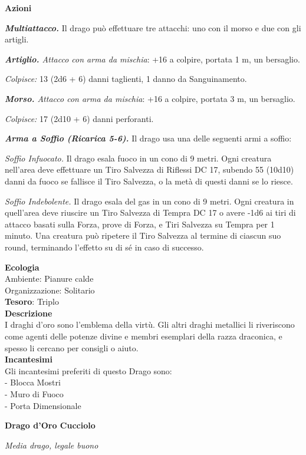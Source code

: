 \begin{multicols}{2}
\textbf{Azioni}

\textit{\textbf{Multiattacco.}} Il drago può effettuare tre attacchi: uno con il morso e due con gli artigli.

\textit{\textbf{Artiglio.} Attacco con arma da mischia}: +16 a colpire, portata 1 m, un bersaglio.

\textit{Colpisce:} 13 (2d6 + 6) danni taglienti, 1 danno da Sanguinamento.

\textit{\textbf{Morso.} Attacco con arma da mischia}: +16 a colpire, portata 3 m, un bersaglio.

\textit{Colpisce:} 17 (2d10 + 6) danni perforanti.

\textit{\textbf{Arma a Soffio (Ricarica 5-6).}} Il drago usa una delle seguenti armi a soffio:

\textit{Soffio Infuocato.} Il drago esala fuoco in un cono di 9 metri. Ogni creatura nell'area deve effettuare un Tiro Salvezza di Riflessi DC 17, subendo 55 (10d10) danni da fuoco se fallisce il Tiro Salvezza, o la metà di questi danni se lo riesce.

\textit{Soffio Indebolente.} Il drago esala del gas in un cono di 9 metri. Ogni creatura in quell'area deve riuscire un Tiro Salvezza di Tempra DC 17 o avere -1d6 ai tiri di attacco basati sulla Forza, prove di Forza, e Tiri Salvezza su Tempra per 1 minuto. Una creatura può ripetere il Tiro Salvezza al termine di ciascun suo round, terminando l'effetto su di sé in caso di successo.

\textbf{Ecologia}\\
Ambiente: Pianure calde\\
Organizzazione: Solitario\\
\textbf{Tesoro}: Triplo\\
\textbf{Descrizione}\\
I draghi d'oro sono l'emblema della virtù. Gli altri draghi metallici li riveriscono come agenti delle potenze divine e membri esemplari della razza draconica, e spesso li cercano per consigli o aiuto.\\
\textbf{Incantesimi}\\
Gli incantesimi preferiti di questo Drago sono:\\
- Blocca Mostri\\
- Muro di Fuoco\\
- Porta Dimensionale

\medskip{}\textbf{Drago d'Oro Cucciolo}

\textit{Media drago, legale buono}


\end{multicols}
